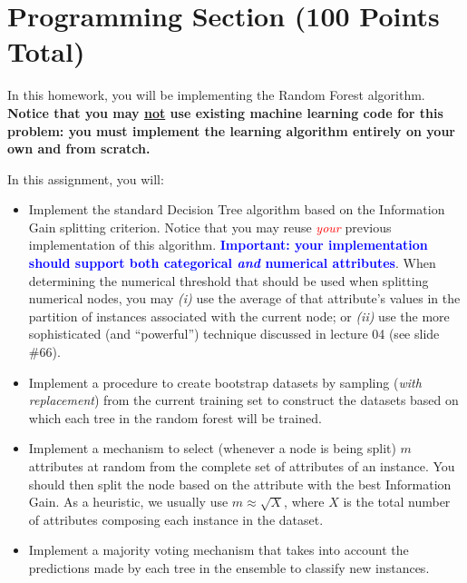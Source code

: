 \documentclass[letterpaper]{article}
\newcommand{\HIGHLIGHT}[1]{\textcolor{blue}{\textbf{#1}}}
\begin{document}
\newpage

\vspace{1cm}
\section*{Programming Section (100 Points Total)}

In this homework, you will be implementing the Random Forest algorithm. \textbf{Notice that you may \ul{not} use existing machine learning code for this problem: you must implement the learning algorithm entirely on your own and from scratch.} 


In this assignment, you will:

\begin{itemize}
\item Implement the standard Decision Tree algorithm based on the Information Gain splitting criterion. Notice that you may reuse \textcolor{red}{\textit{your}} previous implementation of this algorithm. \HIGHLIGHT{Important: your implementation should support both categorical \textit{and} numerical attributes}. When determining the numerical threshold that should be used when splitting numerical nodes, you may \textit{(i)} use the average of that attribute's values in the partition of instances associated with the current node; or \textit{(ii)} use the more sophisticated (and ``powerful'') technique discussed in lecture 04 (see slide \#66). 
\item Implement a procedure to create bootstrap datasets by sampling (\textit{with replacement}) from the current training set to construct the datasets based on which each tree in the random forest will be trained. 
\item Implement a mechanism to select (whenever a node is being split) $m$ attributes at random from the complete set of attributes of an instance. You should then split the node based on the attribute with the best Information Gain. As a heuristic, we usually use $m \approx \sqrt{X}$, where $X$ is the total number of attributes composing each instance in the dataset.
\item Implement a majority voting mechanism that takes into account the predictions made by each tree in the ensemble to classify new instances.

\end{itemize}
\end{document}
